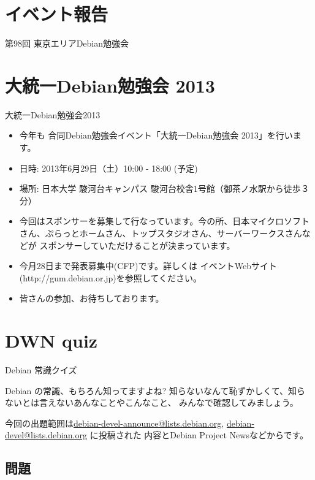 \section{イベント報告}
\begin{frame}{第98回 東京エリアDebian勉強会}
\end{frame}

\section{大統一Debian勉強会 2013}

\begin{frame}{大統一Debian勉強会2013}
\begin{itemize}
\item 今年も 合同Debian勉強会イベント「大統一Debian勉強会 2013」を行います。
\item 日時: 2013年6月29日（土）10:00 - 18:00 (予定)
\item 場所: 日本大学 駿河台キャンパス 駿河台校舎1号館（御茶ノ水駅から徒歩３分）
\item 今回はスポンサーを募集して行なっています。今の所、日本マイクロソフトさん、ぷらっとホームさん、トップスタジオさん、サーバーワークスさんなどが
スポンサーしていただけることが決まっています。
\item 今月28日まで発表募集中(CFP)です。詳しくは イベントWebサイト(http://gum.debian.or.jp)を参照してください。
\item 皆さんの参加、お待ちしております。
\end{itemize}

\end{frame}

\section{DWN quiz}
\begin{frame}{Debian 常識クイズ}

Debian の常識、もちろん知ってますよね?
知らないなんて恥ずかしくて、知らないとは言えないあんなことやこんなこと、
みんなで確認してみましょう。

今回の出題範囲は\url{debian-devel-announce@lists.debian.org},
\url{debian-devel@lists.debian.org} に投稿された
内容とDebian Project Newsなどからです。

\end{frame}

\subsection{問題}


